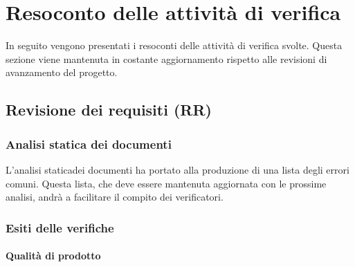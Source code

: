 \section{Resoconto delle attività di verifica}
In seguito vengono presentati i resoconti delle attività di verifica svolte.
Questa sezione viene mantenuta in costante aggiornamento rispetto alle revisioni di avanzamento del progetto\glo.
\subsection{Revisione dei requisiti (RR)}
\subsubsection{Analisi statica dei documenti}
L'analisi statica\glosp dei documenti ha portato alla produzione di una lista degli errori comuni. Questa lista, che deve essere mantenuta aggiornata con le prossime analisi, andrà a facilitare il compito dei verificatori.
\subsubsection{Esiti delle verifiche}
\paragraph{Qualità di prodotto}
